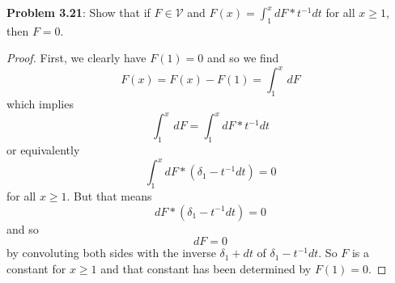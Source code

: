 \documentclass[12pt]{article}
\newcommand{\V}{\mathcal{V}}
\begin{document}
\textbf{Problem 3.21}: Show that if $F \in \V$ and $F(x) = \int_1^x dF * t^{-1} dt$ for all $x \geq 1$, then $F = 0$. 

\begin{proof}
First, we clearly have $F(1) = 0$ and so we find
$$F(x) = F(x) - F(1) = \int_1^x \, dF$$
which implies
$$\int_1^x \, dF = \int_1^x dF * t^{-1} dt$$
or equivalently
$$\int_1^x dF * (\delta_1 - t^{-1} dt) = 0$$
for all $x \geq 1$. But that means
$$dF * (\delta_1 - t^{-1} dt) = 0$$
and so
$$dF = 0$$
by convoluting both sides with the inverse $\delta_1 + dt$ of $\delta_1 - t^{-1} dt$. So $F$ is a constant for $x \geq 1$ and that constant has been determined by $F(1) = 0$.
\end{proof}

\unless\ifdefined\IsMainDocument
\end{document}
